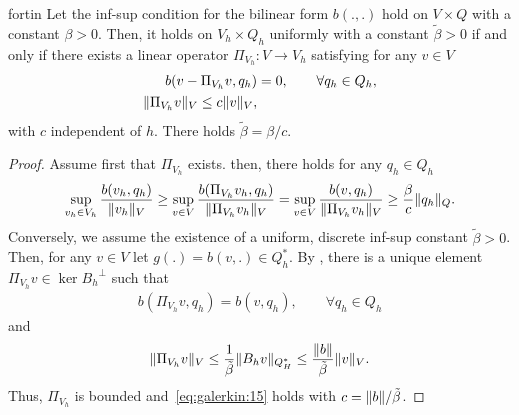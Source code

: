 \begin{Lemma}{fortin}
  Let the inf-sup condition for the bilinear form $b(.,.)$
  hold on $V\times Q$ with a constant
  $\beta>0$. Then, it holds on $V_h\times Q_h$ uniformly with a
  constant $\tilde\beta>0$ if and only if there exists a linear
  operator $\Pi_{V_h}\colon V\to V_h$ satisfying for any $v\in V$
  \begin{align}
    \label{eq:galerkin:15}
    b(v-\Pi_{V_h}v,q_h) &= 0,\qquad\forall q_h\in Q_h,\\
    \lVert\Pi_{V_h}v\rVert_V \le c \lVert v\rVert_V,
  \end{align}
  with $c$ independent of $h$. There holds $\tilde\beta = \beta/c$.
\end{Lemma}

\begin{proof}
  Assume first that $\Pi_{V_h}$ exists. then, there holds for any
  $q_h\in Q_h$
  \begin{gather*}
    \sup_{v_h\in V_h} \frac{b(v_h, q_h)}{\lVert v_h\rVert_V}
    \ge
    \sup_{v\in V} \frac{b(\Pi_{V_h}v_h, q_h)}{\lVert\Pi_{V_h} v_h\rVert_V}
    =
    \sup_{v\in V} \frac{b(v, q_h)}{\lVert\Pi_{V_h} v_h\rVert_V}
    \ge \frac{\beta}{c} \lVert q_h\rVert_Q.
  \end{gather*}
  Conversely, we assume the existence of a uniform, discrete inf-sup
  constant $\tilde\beta>0$. Then, for any $v\in V$ let
  $g(.) = b(v,.) \in Q_h^*$. By
  , there is a unique
  element $\Pi_{V_h} v \in \ker{B_h}^\perp$ such that
  \begin{gather*}
    b(\Pi_{V_h}v , q_h) = b(v,q_h),\qquad\forall q_h\in Q_h
  \end{gather*}
  and
  \begin{gather*}
    \lVert\Pi_{V_h}v\rVert_V
    \le \frac1{\tilde\beta}\lVert B_h v\rVert_{Q_H^*}
    \le \frac{\lVert b\rVert}{\tilde\beta} \lVert v\rVert_V.
  \end{gather*}
  Thus, $\Pi_{V_h}$ is bounded and~\eqref{eq:galerkin:15} holds with
  $c=\lVert b\rVert/\tilde\beta$.
\end{proof}





